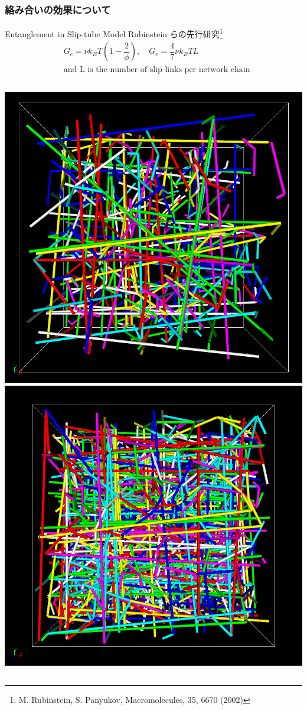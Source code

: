 \documentclass[12pt, dvipdfmx]{beamer}
\begin{document}
\begin{frame}
    \frametitle{絡み合いの効果について}
	\vspace{-3mm}
	\begin{alertblock}{Entanglement in Slip-tube Model}
			\small
			Rubinstein らの先行研究\footnote{
				\scriptsize{M. Rubinstein, S. Panyukov, Macromolecules, 35, 6670 (2002)}
				}
			\vspace{-3mm}
			\scriptsize
			\begin{align*}
				&G_c = \nu k_B T \left(1-\dfrac{2}{\phi} \right), \quad G_e = \dfrac{4}{7} \nu k_B T L \\
				& \text{and L is the number of slip-links per network chain}
			\end{align*}
	\end{alertblock}
	\begin{columns}[onlytextwidth]
			\centering
			\vspace{3mm}
			\includegraphics[width=.8\textwidth]{z_cord_NPT_4Chain.png}
			\vspace{2mm}
				\includegraphics[width=.8\textwidth]{z_cord_4Chain.png}

\end{columns}
\end{frame}
\end{document}
